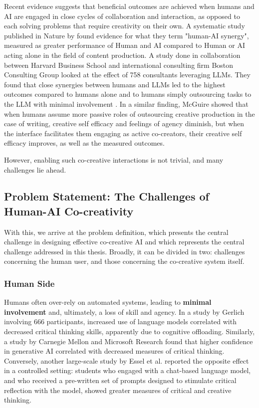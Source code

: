 Recent evidence suggests that beneficial outcomes are achieved when humans and AI are engaged in close cycles of collaboration and interaction, as opposed to each solving problems that require creativity on their own. A systematic study published in Nature by \cite{Vaccaro2024-ne} found evidence for what they term "human-AI synergy", measured as greater performance of Human and AI compared to Human or AI acting alone in the field of content production. A study done in collaboration between Harvard Business School and international consulting firm Boston Consulting Group looked at the effect of 758 consultants leveraging LLMs. They found that close synergies between humans and LLMs led to the highest outcomes compared to humans alone and to humans simply outsourcing tasks to the LLM with minimal involvement \cite{DellAcqua2023-og}. In a similar finding, McGuire \cite{McGuire2024-im} showed that when humans assume more passive roles of outsourcing creative production in  the case of writing, creative self efficacy and feelings of agency diminish, but when the interface facilitates them engaging as active co-creators, their creative self efficacy improves, as well as the measured outcomes. 

However, enabling such co-creative interactions is not trivial, and many challenges lie ahead. 

\subsection{Problem Statement: The Challenges of Human-AI Co-creativity}

With this, we arrive at the problem definition, which presents the central challenge in designing effective co-creative AI and which represents the central challenge addressed in this thesis. Broadly, it can be divided in two: challenges concerning the human user, and those concerning the co-creative system itself.

\subsubsection{Human Side}

Humans often over-rely on automated systems, leading to \textbf{minimal involvement} and, ultimately, a loss of skill and agency. In a study by Gerlich \cite{Gerlich2025-as} involving 666 participants, increased use of language models correlated with decreased critical thinking skills, apparently due to cognitive offloading. Similarly, a study by Carnegie Mellon and Microsoft Research found \cite{Lee2025-dw} that higher confidence in generative AI correlated with decreased measures of critical thinking. Conversely, another large-scale study by Essel et al. \cite{Essel2024-qc} reported the opposite effect in a controlled setting: students who engaged with a chat-based language model, and who received a pre-written set of prompts designed to stimulate critical reflection with the model, showed greater measures of critical and creative thinking.

